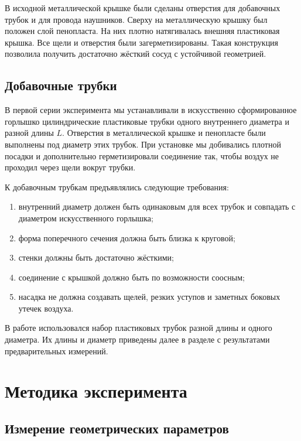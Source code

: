 \documentclass[12pt]{extreport}
\begin{document}
	В исходной металлической крышке были сделаны отверстия для добавочных трубок и для провода  наушников. Сверху на металлическую крышку был положен слой пенопласта. На них плотно натягивалась внешняя пластиковая крышка. Все щели и отверстия были загерметизированы. Такая конструкция позволила получить достаточно жёсткий сосуд с устойчивой геометрией.
	
	
	
	\section{Добавочные трубки}
	
	\hspace{4mm} В первой серии эксперимента мы устанавливали в искусственно сформированное горлышко цилиндрические пластиковые трубки одного внутреннего диаметра и разной длины \(L\). Отверстия в металлической крышке и пенопласте были выполнены под диаметр этих трубок. При установке мы добивались плотной посадки и дополнительно герметизировали соединение так, чтобы воздух не проходил через щели вокруг трубки.
	
	К добавочным трубкам предъявлялись следующие требования:
	\begin{enumerate}
		\item внутренний диаметр должен быть одинаковым для всех трубок и совпадать с диаметром искусственного горлышка;
		\item форма поперечного сечения должна быть близка к круговой;
		\item стенки должны быть достаточно жёсткими;
		\item соединение с крышкой должно быть по возможности соосным;
		\item насадка не должна создавать щелей, резких уступов и заметных боковых утечек воздуха.
	\end{enumerate}
	
	
	В работе использовался набор пластиковых трубок разной длины и одного диаметра. Их длины и диаметр приведены далее в разделе с результатами предварительных измерений.
		
	
	\chapter{Методика эксперимента}
	
	\section{Измерение геометрических параметров}
	
\end{document}
